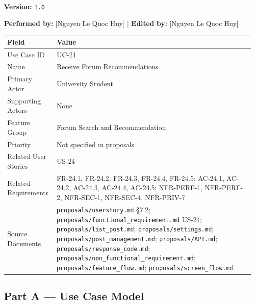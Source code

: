 \documentclass[12pt]{article}
\renewcommand{\baselinestretch}{1.5}
\begin{document}
\textbf{Version:} \texttt{1.0}
\par\medskip

\textbf{Performed by:} [Nguyen Le Quoc Huy] | \textbf{Edited by:} [Nguyen Le Quoc Huy]
\par\medskip

\begingroup
\small
\renewcommand{\baselinestretch}{1.0}\selectfont
\renewcommand{\arraystretch}{1.15}
\setlength{\tabcolsep}{6pt}
\begin{longtable}{|>{\raggedright\arraybackslash}p{}|>{\raggedright\arraybackslash}p{}|}
\hline
\textbf{Field} & \textbf{Value} \\ \hline
\endhead
Use Case ID & UC-21 \\ \hline
Name & Receive Forum Recommendations \\ \hline
Primary Actor & University Student \\ \hline
Supporting Actors & None \\ \hline
Feature Group & Forum Search and Recommendation \\ \hline
Priority & Not specified in proposals \\ \hline
Related User Stories & US-24 \\ \hline
Related Requirements & FR-24.1, FR-24.2, FR-24.3, FR-24.4, FR-24.5; AC-24.1, AC-24.2, AC-24.3, AC-24.4, AC-24.5; NFR-PERF-1, NFR-PERF-2, NFR-SEC-1, NFR-SEC-4, NFR-PRIV-7 \\ \hline
Source Documents & \texttt{proposals/userstory.md} §7.2; \texttt{proposals/functional\_requirement.md} US-24; \texttt{proposals/list\_post.md}; \texttt{proposals/settings.md}; \texttt{proposals/post\_management.md}; \texttt{proposals/API.md}; \texttt{proposals/response\_code.md}; \texttt{proposals/non\_functional\_requirement.md}; \texttt{proposals/feature\_flow.md}; \texttt{proposals/screen\_flow.md} \\ \hline
\end{longtable}
\endgroup
\par\medskip

\hypertarget{sec:part-a-use-case-model}{}
\subsection*{Part A --- Use Case Model}
\par\medskip

\hypertarget{sec:a1-focused-use-case-diagram}{}
\end{document}

